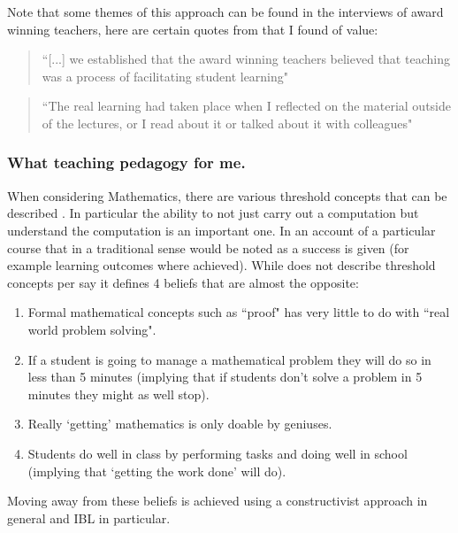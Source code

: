 \documentclass[a4paper,12pt]{article}
\begin{document}
Note that some themes of this approach can be found in the interviews of award winning teachers, here are certain quotes from \cite{Kember2007a} that I found of value:

\begin{quote}
    ``[...] we established that the award winning teachers believed that teaching was a process of facilitating student learning"
\end{quote}

\begin{quote}
    ``The real learning had taken place when I reflected on the material outside of the lectures, or I read about it or talked about it with colleagues"
\end{quote}

\subsubsection{What teaching pedagogy for me.}

When considering Mathematics, there are various threshold concepts that can be described \cite{Cousin2006,Framework2007,Meyer2003}. In particular the ability to not just carry out a computation but understand the computation is an important one. In \cite{Schoenfeld1988} an account of a particular course that in a traditional sense would be noted as a success is given (for example learning outcomes where achieved). While \cite{Schoenfeld1988} does not describe threshold concepts per say it defines 4 beliefs that are almost the opposite:

\begin{enumerate}
    \item Formal mathematical concepts such as ``proof" has very little to do with ``real world problem solving".
    \item If a student is going to manage a mathematical problem they will do so in less than 5 minutes (implying that if students don't solve a problem in 5 minutes they might as well stop).
    \item Really `getting' mathematics is only doable by geniuses.
    \item Students do well in class by performing tasks and doing well in school (implying that `getting the work done' will do).
\end{enumerate}

Moving away from these beliefs is achieved using a constructivist approach in general and IBL in particular.\\
\end{document}
